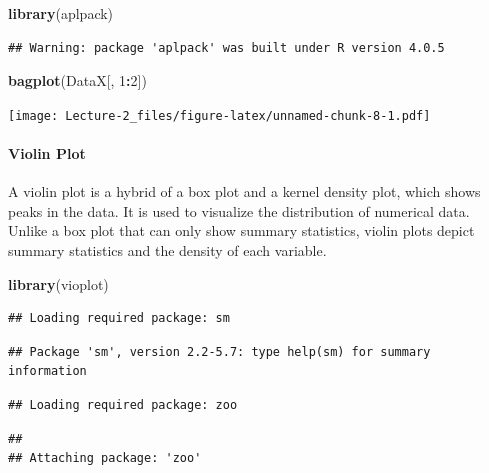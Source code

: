 \documentclass[
]{article}
\newenvironment{Shaded}{\begin{snugshade}}{\end{snugshade}}
\newcommand{\DecValTok}[1]{\textcolor[rgb]{0.00,0.00,0.81}{#1}}
\newcommand{\KeywordTok}[1]{\textcolor[rgb]{0.13,0.29,0.53}{\textbf{#1}}}
\newcommand{\NormalTok}[1]{#1}
\newcommand{\OperatorTok}[1]{\textcolor[rgb]{0.81,0.36,0.00}{\textbf{#1}}}
\begin{document}
\begin{Shaded}
\begin{Highlighting}[]
\KeywordTok{library}\NormalTok{(aplpack)}
\end{Highlighting}
\end{Shaded}

\begin{verbatim}
## Warning: package 'aplpack' was built under R version 4.0.5
\end{verbatim}

\begin{Shaded}
\begin{Highlighting}[]
\KeywordTok{bagplot}\NormalTok{(DataX[, }\DecValTok{1}\OperatorTok{:}\DecValTok{2}\NormalTok{])}
\end{Highlighting}
\end{Shaded}

\texttt{[image: Lecture-2\_files/figure-latex/unnamed-chunk-8-1.pdf]}

\hypertarget{violin-plot}{%
\paragraph{Violin Plot}\label{violin-plot}}

A violin plot is a hybrid of a box plot and a kernel density plot, which
shows peaks in the data. It is used to visualize the distribution of
numerical data. Unlike a box plot that can only show summary statistics,
violin plots depict summary statistics and the density of each variable.

\begin{Shaded}
\begin{Highlighting}[]
\KeywordTok{library}\NormalTok{(vioplot)}
\end{Highlighting}
\end{Shaded}

\begin{verbatim}
## Loading required package: sm
\end{verbatim}

\begin{verbatim}
## Package 'sm', version 2.2-5.7: type help(sm) for summary information
\end{verbatim}

\begin{verbatim}
## Loading required package: zoo
\end{verbatim}

\begin{verbatim}
## 
## Attaching package: 'zoo'
\end{verbatim}
\end{document}
